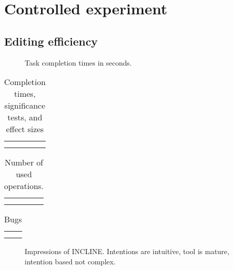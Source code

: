 \section{Controlled experiment}
\subsection{Editing efficiency}

\begin{figure}[ht]
    \centering
    \caption{Task completion times in seconds.}
    \label{fig:completion-times}
\end{figure}

\begin{table}[ht]
    \centering
    \begin{tabular}{c|c}
         &  \\
         & 
    \end{tabular}
    \caption{Completion times, significance tests, and effect sizes}
    \label{tab:significance}
\end{table}

\begin{table}[ht]
    \centering
    \begin{tabular}{c|c}
         &  \\
         & 
    \end{tabular}
    \caption{Number of used operations.}
    \label{tab:edit-ops}
\end{table}

\begin{table}[ht]
    \centering
    \begin{tabular}{c|c}
         &  \\
         & 
    \end{tabular}
    \caption{Bugs}
    \label{tab:Bugs}
\end{table}

\begin{figure}[ht]
    \centering
    \caption{Impressions of INCLINE. Intentions are intuitive, tool is mature, intention based not complex.}
    \label{fig:maturity}
\end{figure}

